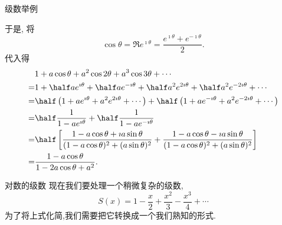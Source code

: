 \documentclass[fontset=windows, chinese, 10pt]{beamer}
\begin{document}
\begin{frame}{级数举例}
  \small

  于是, 将
\begin{equation}
    \cos \theta = \Re e^{\imath \theta} = \frac{e^{\imath \theta} +e^{-\imath \theta} }{2} .
\end{equation}
代入得
\begin{align*}
   & 1 + a \cos \theta + a^2 \cos 2\theta + a^3 \cos 3\theta + \cdots 
    \\  
 = &  1 + \half a e^{\imath \theta} + \half a e^{- \imath \theta} + \half a^2 e^{2\imath \theta} + \half a^2 e^{-2\imath \theta}  + \cdots 
 \\  
 =   & \half \left( 1 + a e^{\imath \theta} + a^2 e^{2\imath \theta} + \cdots \right)  
+ \half \left( 1 + a e^{- \imath \theta} + a^2 e^{-2\imath \theta}  + \cdots \right) 
\\  
= &  \half \frac{1}{1 - a e^{\imath \theta} } + \half \frac{1}{1 - a e^{-\imath \theta} }
\\  
= &  \half \left[ \frac{1-a\cos\theta + \imath a \sin \theta }{(1-a\cos\theta)^2 + (a\sin \theta)^2} + \frac{1-a\cos\theta - \imath a \sin \theta}{(1-a\cos\theta)^2 + (a\sin \theta)^2} \right]
 \\  
= &  \frac{1-a\cos\theta}{1-2 a \cos\theta + a^2} .
\end{align*}
\end{frame}

\begin{frame}{对数的级数}
  \small
现在我们要处理一个稍微复杂的级数,
\begin{equation}
    S(x) = 1 - \frac{x}{2} + \frac{x^2}{3} - \frac{x^3}{4} + \cdots
\end{equation}
为了将上式化简,我们需要把它转换成一个我们熟知的形式.
\end{frame}
\end{document}

